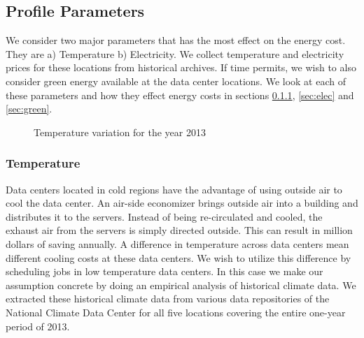 \documentclass[letterpaper,twocolumn,10pt]{article}
\begin{document}
\subsection{Profile Parameters}
We consider two major parameters that has the most effect on the energy cost. They are a) Temperature b) Electricity. We collect temperature and electricity prices for these locations from historical archives. If time permits, we wish to also consider green energy available at the data center locations. We look at each of these parameters and how they effect energy costs in sections \ref{sec:temp}, \ref{sec:elec} and \ref{sec:green}.


\begin{figure} %
    \centering
    \caption{Temperature variation for the year 2013}%
    \label{fig:temp}%
\end{figure}

\subsubsection{Temperature} \label{sec:temp}
Data centers located in cold regions have the advantage of using outside air to cool the data center. An air-side economizer brings outside air into a building and distributes it to the servers. Instead of being re-circulated and cooled, the exhaust air from the servers is simply directed outside. This can result in million dollars of saving annually. A difference in temperature across data centers mean different cooling costs at these data centers. We wish to utilize this difference by scheduling jobs in low temperature data centers. In this case we make our assumption concrete by doing an empirical analysis of historical climate data. We extracted these historical climate data from various data repositories of the National Climate Data Center \cite{climatedata} for all five locations covering the entire one-year period of 2013.
\end{document}
